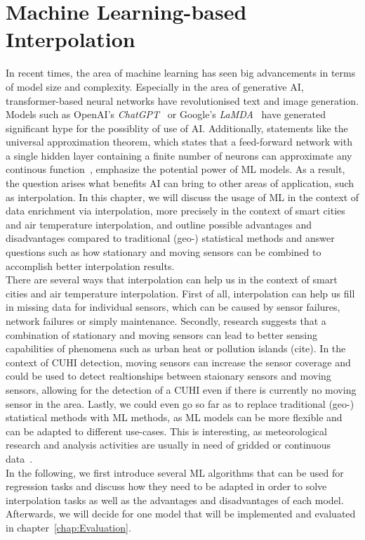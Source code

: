 \chapter{Machine Learning-based Interpolation}
\label{chap:Machine Learning based Interpolation}

In recent times, the area of machine learning has seen big advancements in terms of model size and complexity. Especially in the area of generative AI, transformer-based neural networks have revolutionised text and image generation. Models such as OpenAI's \textit{ChatGPT}~\cite{openai2023gpt4} or Google's \textit{LaMDA}~\cite{thoppilan2022lamda} have generated significant hype for the possiblity of use of AI\@. Additionally, statements like the universal approximation theorem, which states that a feed-forward network with a single hidden layer containing a finite number of neurons can approximate any continous function~\cite{hornik1989multilayer}, emphasize the potential power of ML models.
As a result, the question arises what benefits AI can bring to other areas of application, such as interpolation. In this chapter, we will discuss the usage of ML in the context of data enrichment via interpolation, more precisely in the context of smart cities and air temperature interpolation, and outline possible advantages and disadvantages compared to traditional (geo-) statistical methods and answer questions such as how stationary and moving sensors can be combined to accomplish better interpolation results.\\
There are several ways that interpolation can help us in the context of smart cities and air temperature interpolation. First of all, interpolation can help us fill in missing data for individual sensors, which can be caused by sensor failures, network failures or simply maintenance. Secondly, research suggests that a combination of stationary and moving sensors can lead to better sensing capabilities of phenomena such as urban heat or pollution islands (cite). In the context of CUHI detection, moving sensors can increase the sensor coverage and could be used to detect realtionships between staionary sensors and moving sensors, allowing for the detection of a CUHI even if there is currently no moving sensor in the area. Lastly, we could even go so far as to replace traditional (geo-) statistical methods with ML methods, as ML models can be more flexible and can be adapted to different use-cases. This is interesting, as meteorological research and analysis activities are usually in need of gridded or continuous data~\cite{sekulic2020spatio}.\\
In the following, we first introduce several ML algorithms that can be used for regression tasks and discuss how they need to be adapted in order to solve interpolation tasks as well as the advantages and disadvantages of each model. Afterwards, we will decide for one model that will be implemented and evaluated in chapter~\ref{chap:Evaluation}.

